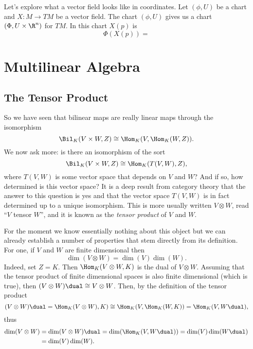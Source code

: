 \documentclass[12pt,oneside]{book}
\begin{document}
Let's explore what a vector field looks like in coordinates. Let \( (\phi, U) \) be a
chart and \( X \colon M \to TM \) be a vector field. The chart \( (\phi, U) \) gives us a
chart \( (\Phi, U \times \R^n) \) for \( TM \). In this chart \( X(p) \) is
\begin{equation*}
	\Phi(X(p)) = 
\end{equation*}


\parbreak


\chapter{Multilinear Algebra}
\section{The Tensor Product}
So we have seen that bilinear maps are really linear maps through the isomorphism
\begin{equation*}
	\Bil_K(V \times W, Z) \cong \Hom_K(V, \Hom_K(W, Z)).
\end{equation*}
We now ask more: is there an isomorphism of the sort
\begin{equation*}
	\Bil_K(V \times W, Z) \cong \Hom_K(T(V, W), Z),
\end{equation*}
where \( T(V,W) \) is some vector space that depends on \( V \) and \( W \)? And if so,
how determined is this vector space? It is a deep result from category theory that the
answer to this question is yes and that the vector space \( T(V,W) \) is in fact
determined up to a unique isomorphism. This is more usually written \( V \otimes W \),
read ``\( V \) tensor \( W \)'', and it is known as the \emph{tensor product} of \( V \)
and \( W \).

For the moment we know essentially nothing about this object but we can already establish
a number of properties that stem directly from its definition. For one, if \( V \) and \(
W\) are finite dimensional then
\begin{equation*}
	\dim(V \otimes W) = \dim(V) \dim(W).
\end{equation*}
Indeed, set \( Z = K \). Then \( \Hom_K(V \otimes W, K) \) is the dual of \( V \otimes W
\). Assuming that the tensor product of finite dimensional spaces is also finite
dimensional (which is true), then \( (V \otimes W)\dual \cong V \otimes W \). Then, by the
definition of the tensor product
\begin{equation*}
	(V \otimes W)\dual = \Hom_K(V \otimes W), K) \cong \Hom_K(V, \Hom_K(W, K)) = \Hom_K(V,
	W\dual),
\end{equation*}
thus
\begin{align*}
	\dim(V \otimes W) & = \dim(V \otimes W)\dual = \dim(\Hom_K(V, W\dual)) =
	\dim(V)\dim(W\dual) \\
										& = \dim(V)\dim(W).
\end{align*}
\end{document}

